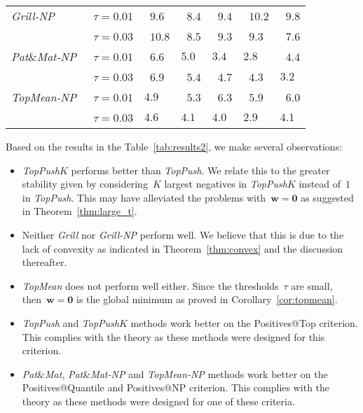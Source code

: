 \documentclass[11pt,a4paper]{article}
\theoremstyle{definition}
\newcommand{\toppush}{\textit{TopPush}\xspace}
\newcommand{\toppushk}{\textit{TopPush$K$}\xspace}
\newcommand{\grill}{\textit{Grill}\xspace}
\newcommand{\patmat}{\textit{Pat}\textup{\&}\textit{Mat}\xspace}
\newcommand{\topmean}{\textit{TopMean}\xspace}
\newcommand{\grillnp}{\textit{Grill-NP}\xspace}
\newcommand{\patmatnp}{\textit{Pat}\textup{\&}\textit{Mat-NP}\xspace}
\newcommand{\topmeannp}{\textit{TopMean-NP}\xspace}
\begin{document}
\begin{table}[t]
{\begin{tabular}{@{} lllllll @{}}
      \grillnp   &~$\tau=0.01$ &~$9.6$                       &~$8.4$                                      &~$9.4$                                   &~$10.2$                      &~$9.8$ \\
                 &~$\tau=0.03$ &~$10.8$                      &~$8.5$                                      &~$9.3$                                   &~$9.3$                       &~$7.6$ \\
      \patmatnp  &~$\tau=0.01$ &~$6.6$                       & \cellcolor{mygreen!30}$5.0$                & \cellcolor{mygreen!75}$3.4$             & \cellcolor{mygreen!75}$2.8$ &~$4.4$ \\
                 &~$\tau=0.03$ &~$6.9$                       &~$5.4$                                      &~$4.7$                                   &~$4.3$                       & \cellcolor{mygreen!75}$3.2$ \\
      \topmeannp &~$\tau=0.01$ & \cellcolor{mygreen!30}$4.9$ &~$5.3$                                      &~$6.3$                                   &~$5.9$                       &~$6.0$ \\
                 &~$\tau=0.03$ & \cellcolor{mygreen!30}$4.6$ & \cellcolor{mygreen!75}$4.1$                & \cellcolor{mygreen!30}$4.0$             & \cellcolor{mygreen!30}$2.9$ & \cellcolor{mygreen!30}$4.1$ \\
      \bottomrule
    \end{tabular}
  }
\end{table}

\noindent Based on the results in the Table~\ref{tab:results2}, we make several observations:
\begin{itemize}
  \item \toppushk performs better than \toppush. We relate this to the greater stability given by considering~$K$ largest negatives in \toppushk instead of~$1$ in \toppush. This may have alleviated the problems with~$\bm{w}=\bm{0}$ as suggested in Theorem~\ref{thm:large_t}.
  \item Neither \grill nor \grillnp perform well. We believe that this is due to the lack of convexity as indicated in Theorem~\ref{thm:convex} and the discussion thereafter.
  \item \topmean does not perform well either. Since the thresholds~$\tau$ are small, then~$\bm{w}=\bm{0}$ is the global minimum as proved in Corollary~\ref{cor:topmean}.
  \item \toppush and \toppushk methods work better on the Positives@Top criterion. This complies with the theory as these methods were designed for this criterion.
  \item \patmat, \patmatnp and \topmeannp methods work better on the Positives@Quantile and Positives@NP criterion. This complies with the theory as these methods were designed for one of these criteria.
\end{itemize}
\end{document}
